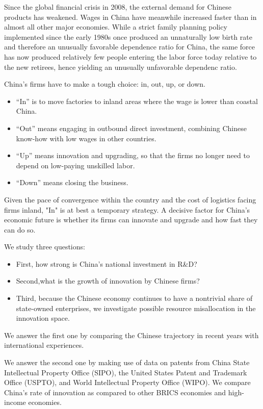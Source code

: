 \documentclass{article}
\begin{document}
    Since the global financial crisis in 2008, the external demand for Chinese products has weakened. Wages in China have meanwhile increased faster than in almost all other major economies. While a strict family planning policy implemented since the early 1980s once produced an unnaturally low birth rate and therefore an unusually favorable dependence ratio for China, the same force has now produced relatively few people entering the labor force today relative to the
    new retirees, hence yielding an unusually unfavorable dependenc ratio.

    China’s firms have to make a tough choice: in, out, up, or down.
    \begin{itemize}
        \item “In” is to move factories to inland areas where the wage is lower than coastal China.
        \item “Out” means engaging in outbound direct investment, combining Chinese know-how with low wages in other countries.
        \item “Up” means innovation and upgrading, so that the firms no longer need to depend on low-paying unskilled labor. 
        \item  “Down” means closing the business.
    \end{itemize}
    Given the pace of convergence within the country and the cost of logistics facing firms inland, "In" is at best a temporary strategy. A decisive factor for China’s economic future is whether its firms can innovate and upgrade and how fast they can do so.

    We study three questions:
    \begin{itemize}
        \item First, how strong is China’s national investment in R\&D? 
        \item Second,what is the growth of innovation by Chinese firms?
        \item Third, because the Chinese economy continues to have a nontrivial share of state-owned enterprises, we investigate possible resource misallocation in the innovation space.
    \end{itemize}
    
    We answer the first one by comparing the Chinese trajectory in recent years with international experiences.

    We answer the second one by making use of data on patents from China State Intellectual Property Office (SIPO), the United States Patent and Trademark Office (USPTO), and World Intellectual Property Office (WIPO). We compare China’s rate of innovation as compared to other BRICS economies and high-income economies.
\end{document}
